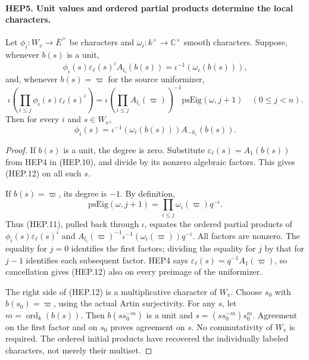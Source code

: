 \paragraph{HEP5. Unit values and ordered partial products determine the local characters.}
\label{claim:HEP5}
Let $\phi_i:W_v\to\overline E^\times$ be characters and
$\omega_i:k^\times\to\mathbb C^\times$ smooth characters.
Suppose, whenever $b(s)$ is a unit,
\[
 \phi_i(s)\varepsilon_\ell(s)^i A_{l_i}(b(s))
                             =\iota^{-1}(\omega_i(b(s))),
 \tag{HEP.10}
\]
and, whenever $b(s)=\varpi$ for the source uniformizer,
\[
 \iota\left(\prod_{i\leq j}\phi_i(s)\varepsilon_\ell(s)^i\right)
  =\iota\left(\prod_{i\leq j}A_{l_i}(\varpi)\right)^{-1}
                                  \mathrm{psEig}(\omega,j+1)
                      \quad(0\leq j<n).
 \tag{HEP.11}
\]
Then for every $i$ and $s\in W_v$,
\[
       \phi_i(s)=\iota^{-1}(\omega_i(b(s)))A_{-h_i}(b(s)).
 \tag{HEP.12}
\]
\begin{proof}
If $b(s)$ is a unit, the degree is zero.  Substitute
$\varepsilon_\ell(s)=A_1(b(s))$ from HEP4 in (HEP.10),
and divide by its nonzero algebraic factors.  This gives
(HEP.12) on all such $s$.

If $b(s)=\varpi$, its degree is $-1$.  By definition,
\[
       \mathrm{psEig}(\omega,j+1)
                  =\prod_{i\leq j}\omega_i(\varpi)q^{-i}.
 \tag{HEP.13}
\]
Thus (HEP.11), pulled back through $\iota$, equates the ordered
partial products of $\phi_i(s)\varepsilon_\ell(s)^i$ and
$A_{l_i}(\varpi)^{-1}\iota^{-1}(\omega_i(\varpi))q^{-i}$.
All factors are nonzero.  The equality for $j=0$ identifies the
first factors; dividing the equality for $j$ by that for $j-1$
identifies each subsequent factor.  HEP4 says
$\varepsilon_\ell(s)=q^{-1}A_1(\varpi)$, so cancellation gives
(HEP.12) also on every preimage of the uniformizer.

The right side of (HEP.12) is a multiplicative character of $W_v$.
Choose $s_0$ with $b(s_0)=\varpi$, using the actual Artin
surjectivity.  For any $s$, let $m=\operatorname{ord}_k(b(s))$.
Then $b(ss_0^{-m})$ is a unit and
$s=(ss_0^{-m})s_0^m$.  Agreement on the first factor and on $s_0$
proves agreement on $s$.  No commutativity of $W_v$ is required.
The ordered initial products have recovered the individually
labeled characters, not merely their multiset.
\end{proof}

